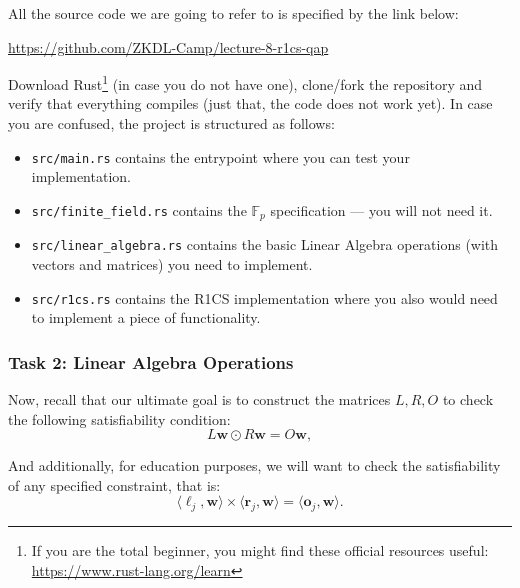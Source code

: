 \documentclass{zkdl-tests-template}
\begin{document}
All the source code we are going to refer to is specified by the link below:
\begin{center}
    \url{https://github.com/ZKDL-Camp/lecture-8-r1cs-qap}
\end{center}

Download Rust\footnote{If you are the total beginner, you might find these official resources useful: \url{https://www.rust-lang.org/learn}} (in case you do not have one), clone/fork the repository and verify that everything compiles (just that, the code does not work yet). In case you are confused, the project is structured as follows:
\begin{itemize}
    \item \texttt{src/main.rs} contains the entrypoint where you can test your implementation.
    \item \texttt{src/finite\_field.rs} contains the $\mathbb{F}_p$ specification --- you will not need it.
    \item \texttt{src/linear\_algebra.rs} contains the basic Linear Algebra operations (with vectors and matrices) you need to implement.
    \item \texttt{src/r1cs.rs} contains the R1CS implementation where you also would need to implement a piece of functionality.
\end{itemize}

\subsubsection{Task 2: Linear Algebra Operations}

Now, recall that our ultimate goal is to construct the matrices $L,R,O$ to check the following satisfiability condition:
\begin{equation*}
    L\mathbf{w} \odot R\mathbf{w} = O\mathbf{w},
\end{equation*}

And additionally, for education purposes, we will want to check the satisfiability of any specified constraint, that is:
\begin{equation*}
    \langle \boldsymbol{\ell}_j, \mathbf{w} \rangle \times \langle \boldsymbol{r}_j, \mathbf{w} \rangle = \langle \boldsymbol{o}_j, \mathbf{w} \rangle.
\end{equation*}
\end{document}
